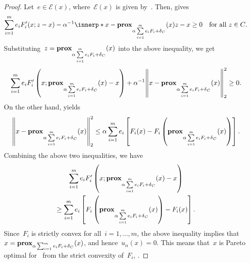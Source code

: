 \documentclass[../../main]{subfiles}
\begin{document}
\begin{proof}
    Let~$e \in \mathcal{E}(x)$, where~$\mathcal{E}(x)$ is given by~.
    Then,  gives
    \begin{equation}
        \sum_{i = 1}^{m} e_i F_i'(x; z - x) - \alpha^{-1} \innerp*{ x - \prox_{\alpha \sum\limits_{i = 1}^{m} e_i F_i + \indicator_C}(x) }{z - x} \ge 0 \forallcondition{z \in C}
        .\end{equation}
    Substituting~$z = \prox_{\alpha \sum\limits_{i = 1}^{m} e_i F_i + \indicator_C}(x)$ into the above inequality, we get
    \begin{equation}
        \sum_{i = 1}^{m} e_i F_i' \left(x; \prox_{\alpha \sum\limits_{i = 1}^{m} e_i F_i + \indicator_C}(x) - x \right) + \alpha^{-1} \norm*{ x - \prox_{\alpha \sum\limits_{i = 1}^{m} e_i F_i + \indicator_C}(x) }_2^2 \ge 0
        .\end{equation}
    On the other hand,  yields
    \begin{equation}
        \norm*{x - \prox_{\alpha \sum\limits_{i = 1}^{m} e_i F_i + \indicator_C}(x)}_2^2 \le \alpha \sum_{i = 1}^{m} e_i \left[ F_i(x) - F_i\left(\prox_{\alpha \sum\limits_{i = 1}^{m} e_i F_i + \indicator_C}(x)\right) \right]
        .\end{equation}
    Combining the above two inequalities, we have
    \begin{multline}
        \sum_{i = 1}^{m} e_i F_i' \left(x; \prox_{\alpha \sum\limits_{i = 1}^{m} e_i F_i + \indicator_C}(x) - x \right) \\
        \ge \sum_{i = 1}^{m} e_i \left[ F_i\left(\prox_{\alpha \sum\limits_{i = 1}^{m} e_i F_i + \indicator_C}(x)\right) - F_i(x) \right]
        .\end{multline}
    Since~$F_i$ is strictly convex for all~$i = 1, \dots, m$, the above inequality implies that~$x = \prox_{\alpha \sum_{i = 1}^{m} e_i F_i + \indicator_C}(x)$, and hence~$u_\alpha(x) = 0$.
    This means that~$x$ is Pareto optimal for~ from the strict convexity of~$F_i$, .
\end{proof}
\end{document}
